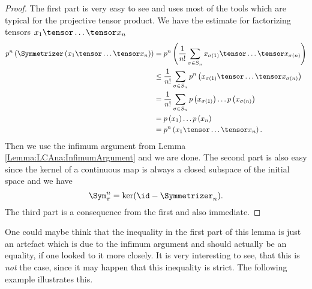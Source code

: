 \begin{proof}
	The first part is very easy to see and uses most of the tools which are 
	typical for the projective tensor product. We have the estimate for 
	factorizing tensors $x_1 \tensor \ldots \tensor x_n$
	\begin{align*}
		p^n \left(
			\Symmetrizer \left(
				x_1 \tensor \ldots \tensor x_n
			\right)
		\right)
		& =
		p^n \left(
			\frac{1}{n!}
			\sum	\limits_{\sigma \in S_n}
			x_{\sigma(1)} 
			\tensor \ldots \tensor 
			x_{\sigma(n)}
		\right)
		\\
		& \leq
		\frac{1}{n!}
		\sum\limits_{\sigma \in S_n}
		p^n \left(
			x_{\sigma(1)} 
			\tensor \ldots \tensor 
			x_{\sigma(n)}
		\right)
		\\
		& =
		\frac{1}{n!}
		\sum\limits_{\sigma \in S_n}
		p \left( x_{\sigma(1)} \right)
		\ldots
		p \left( x_{\sigma(n)} \right)
		\\
		& =
		p \left( x_1 \right)
		\ldots
		p \left( x_n \right)
		\\
		& =
		p^n \left(
			x_1 \tensor \ldots \tensor x_n
		\right).
	\end{align*}
	Then we use the infimum argument from Lemma 
	\ref{Lemma:LCAna:InfimumArgument} and we are done.
	The second part is also easy since the kernel of a continuous map is
	always a closed subspace of the initial space and we have
	\begin{equation*}
		\Sym_{\pi}^n 
		= 
		\ker (\id - \Symmetrizer_n).
	\end{equation*}
	The third part is a consequence from the first and also immediate.
\end{proof}
One could maybe think that the inequality in the first part of this lemma is 
just an artefact which is due to the infimum argument and should actually be 
an equality, if one looked to it more closely. It is very interesting to see, 
that this is \textit{not} the case, since it may happen that this 
inequality is strict. The following example illustrates this.
